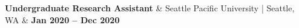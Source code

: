 \textbf{Undergraduate Research Assistant} & 
Seattle Pacific University | Seattle, WA & 
\textbf{Jan 2020 -- Dec 2020}